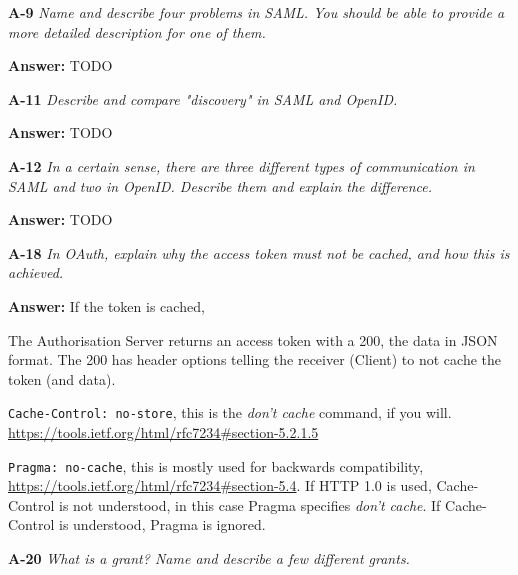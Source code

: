 \documentclass[a4paper]{article}
\newcommand{\Q}[2]{ \vspace{10pt} \textbf{A-#1} \textit{#2} }
\newcommand{\A}[1]{ \textbf{Answer:} #1 }
\begin{document}
\Q{9} {
    Name and describe four problems in SAML. You should be able to provide a 
    more detailed description for one of them.
}

\A{
    TODO
}

\Q{11} {
    Describe and compare "discovery" in SAML and OpenID.
}

\A{
    TODO
}

\Q{12} {
    In a certain sense, there are three different types of communication in 
    SAML and two in OpenID. Describe them and explain the difference.
}

\A{
    TODO
}

\Q{18} { %
    In OAuth, explain why the access token must not be cached, and how this is 
    achieved.
}

\A{
    If the token is cached, 

    The Authorisation Server returns an access token with a 200,
    the data in JSON format. The 200 has header options
    telling the receiver (Client) to not cache the token (and data).

    \texttt{Cache-Control: no-store}, this is the \textit{don't cache}
    command, if you will. 
    \url{https://tools.ietf.org/html/rfc7234#section-5.2.1.5}

    \texttt{Pragma: no-cache}, this is mostly used for backwards 
    compatibility, \url{https://tools.ietf.org/html/rfc7234#section-5.4}.
    If HTTP 1.0 is used, Cache-Control is not understood,
    in this case Pragma specifies \textit{don't cache}. 
    If Cache-Control is understood, Pragma is ignored.

}

\Q{20} { %
    What is a grant? Name and describe a few different grants.
}
\end{document}
